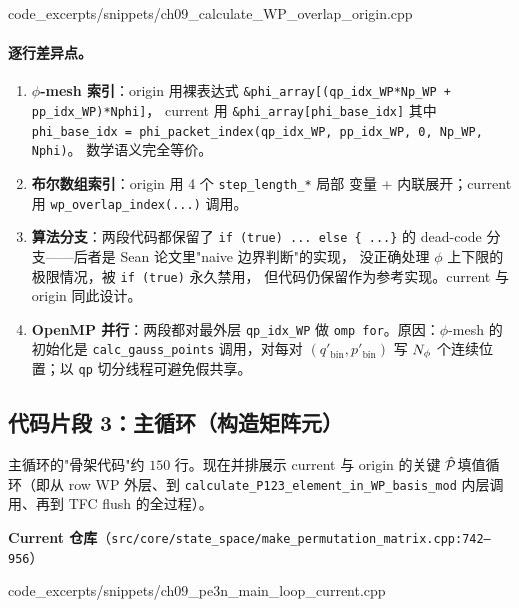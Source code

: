 
{code_excerpts/snippets/ch09_calculate_WP_overlap_origin.cpp}

\paragraph{逐行差异点。}
\begin{enumerate}
\item \textbf{\(\phi\)-mesh 索引}：origin 用裸表达式
      \verb|&phi_array[(qp_idx_WP*Np_WP + pp_idx_WP)*Nphi]|，
      current 用 \verb|&phi_array[phi_base_idx]| 其中
      \verb|phi_base_idx = phi_packet_index(qp_idx_WP, pp_idx_WP, 0, Np_WP, Nphi)|。
      数学语义完全等价。
\item \textbf{布尔数组索引}：origin 用 4 个 \texttt{step\_length\_*} 局部
      变量 + 内联展开；current 用 \verb|wp_overlap_index(...)| 调用。
\item \textbf{算法分支}：两段代码都保留了 \texttt{if (true) ... else \{ ...\}}
      的 dead-code 分支——后者是 Sean 论文里"naive 边界判断"的实现，
      没正确处理 \(\phi\) 上下限的极限情况，被 \texttt{if (true)} 永久禁用，
      但代码仍保留作为参考实现。current 与 origin 同此设计。
\item \textbf{OpenMP 并行}：两段都对最外层 \texttt{qp\_idx\_WP} 做
      \texttt{omp for}。原因：\(\phi\)-mesh 的初始化是 \texttt{calc\_gauss\_points}
      调用，对每对 \((q'_{\text{bin}}, p'_{\text{bin}})\) 写
      \(N_{\phi}\) 个连续位置；以 \texttt{qp} 切分线程可避免假共享。
\end{enumerate}

\subsection{代码片段 3：主循环（构造矩阵元）}
\label{subsec:ch09-code-main-loop}

主循环的"骨架代码"约 \(150\) 行。现在并排展示 current 与 origin 的关键
\(\hat{\mathcal{P}}\)填值循环（即从 row WP 外层、到 \texttt{calculate\_P123\_element\_in\_WP\_basis\_mod}
内层调用、再到 TFC flush 的全过程）。

\noindent\textbf{Current 仓库}（\texttt{src/core/state\_space/make\_permutation\_matrix.cpp:742--956}）


{code_excerpts/snippets/ch09_pe3n_main_loop_current.cpp}

